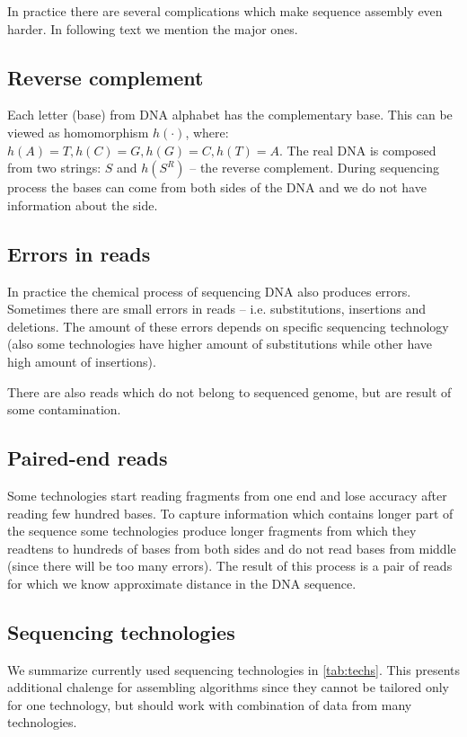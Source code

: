 In practice there are several complications which make sequence assembly even harder.
In following text we mention the major ones.

\subsection{Reverse complement}

Each letter (base) from DNA alphabet has the complementary base. This can
be viewed as homomorphism $h(\cdot)$, where: $h(A) = T, h(C) = G, h(G) = C, h(T) = A$.
The real DNA is composed from two strings: $S$ and $h(S^R)$ -- the reverse complement.
During sequencing process the bases can come from both sides of the DNA and
we do not have information about the side.

\subsection{Errors in reads}

In practice the chemical process of sequencing DNA also produces errors.
Sometimes there are small errors in reads -- i.e. substitutions, insertions
and deletions. The amount of these errors depends on specific sequencing technology
(also some technologies have higher amount of substitutions while other
have high amount of insertions).

There are also reads which do not belong to sequenced genome, but are result
of some contamination.

\subsection{Paired-end reads}

Some technologies start reading fragments from one end and lose accuracy after
reading few hundred bases. To capture information which contains longer part of the
sequence some technologies produce longer fragments from which they readtens to hundreds
of bases from both sides and do not read bases from middle (since there will be
too many errors). The result of this process is a pair of reads for which we know approximate
distance in the DNA sequence.

\subsection{Sequencing technologies}

We summarize currently used sequencing technologies in \ref{tab:techs}.
This presents additional chalenge for assembling algorithms since they
cannot be tailored only for one technology, but should work with combination
of data from many technologies.


